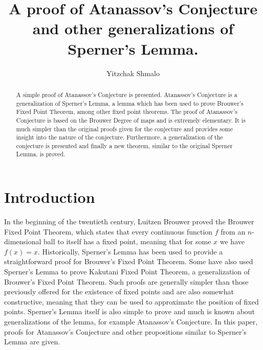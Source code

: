 \documentclass[11pt]{amsart}
\theoremstyle{definition}
\theoremstyle{remark}
\numberwithin{equation}{section}
\theoremstyle{definition}
\begin{document}
	\title[Simple proof of anassov's conjecture]{A proof of Atanassov's Conjecture and other generalizations of Sperner's Lemma.}
	
	
	
	
	
	\author{Yitzchak Shmalo}
	\address{}
	\email{ }
	
	
	\begin{abstract}
		A simple proof of Atanassov's Conjecture is presented. Atanassov's Conjecture is a generalization of Sperner's Lemma, a lemma which has been used to prove Brouwer's Fixed Point Theorem, among other fixed point theorems. The proof of Atanassov's Conjecture is based on the Brouwer Degree of maps and is extremely elementary. It is much simpler than the original proofs given for the conjecture and provides some insight into the nature of the conjecture. Furthermore, a generalization of the conjecture is presented and finally a new theorem, similar to the original Sperner Lemma, is proved.             
	\end{abstract}
	
	
	\maketitle
	
	
	\section{Introduction}
	
	In the beginning of the twentieth century, Luitzen Brouwer proved the Brouwer Fixed Point Theorem, which states that every continuous function $f$ from an $n$-dimensional ball to itself has a fixed point, meaning that for some $x$ we have $f(x)=x$. Historically, Sperner's Lemma has been used to provide a straightforward proof for Brouwer's Fixed Point Theorem. Some have also used Sperner's Lemma to prove Kakutani Fixed Point Theorem, a generalization of Brouwer's Fixed Point Theorem. Such proofs are generally simpler than those previously offered for the existence of fixed points and are also somewhat constructive, meaning that they can be used to approximate the position of fixed points. Sperner's Lemma itself is also simple to prove and much is known about generalizations of the lemma, for example Atanassov's Conjecture. In this paper, proofs for Atanassov's Conjecture and other propositions similar to Sperner's Lemma are given.   
	
\end{document}
